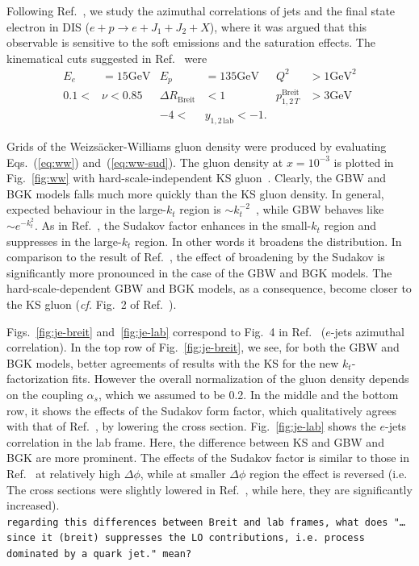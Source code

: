 \documentclass[12pt]{article}
\numberwithin{equation}{section}
\numberwithin{table}{section}
\numberwithin{figure}{section}
\newcommand{\GeV}[0]{\mathrm{GeV}}
\newcommand{\comment}[1]{\texttt{\color{red}#1}}
\begin{document}
Following Ref.~\cite{vanHameren:2021sqc}, we study the azimuthal correlations of jets and the final state electron in DIS ($e+p\rightarrow e+J_1+J_2+X$), where it was argued that this observable is sensitive to the soft emissions and the saturation effects. 
The kinematical cuts suggested in Ref.~\cite{vanHameren:2021sqc} were
\begin{align*}
	E_e&=15\GeV& E_p&=135\GeV& Q^2&>1\GeV^2\\
	0.1<&\nu<0.85&\Delta R_{\mathrm{Breit}}&<1&p^{\mathrm{Breit}}_{1,2\,T}&>3\GeV\\
	&&-4<&y_{1,2\,\mathrm{lab}}<-1.&&
\end{align*}

Grids of the Weizs\"acker-Williams gluon density were produced by evaluating Eqs.~(\ref{eq:ww}) and~(\ref{eq:ww-sud}).
The gluon density at $x=10^{-3}$ is plotted in Fig.~\ref{fig:ww} with hard-scale-independent KS gluon~\cite{vanHameren:2021sqc}. Clearly, the GBW and BGK models falls much more quickly than the KS gluon density. In general, expected behaviour in the large-$k_t$ region is $\sim k_t^{-2}$~\cite{Dominguez:2010xd,Dominguez:2011wm}, while GBW behaves like $\sim e^{-k_t^2}$.
As in Ref.~\cite{vanHameren:2021sqc}, the Sudakov factor enhances in the small-$k_t$ region and suppresses in the large-$k_t$ region. In other words it broadens the distribution. In comparison to the result of Ref.~\cite{vanHameren:2021sqc}, the effect of broadening by the Sudakov is significantly more pronounced in the case of the GBW and BGK models. The hard-scale-dependent GBW and BGK models, as a consequence, become closer to the KS gluon (\textit{cf.} Fig.~2 of Ref.~\cite{vanHameren:2021sqc}).  

Figs.~\ref{fig:je-breit} and~\ref{fig:je-lab} correspond to Fig.~4 in Ref.~\cite{vanHameren:2021sqc} ($e$-jets azimuthal correlation). 
In the top row of Fig.~\ref{fig:je-breit}, we see, for both the GBW and BGK models, better agreements of results with the KS for the new $k_t$-factorization fits. However the overall normalization of the gluon density depends on the coupling $\alpha_s$, which we assumed to be 0.2. In the middle and the bottom row, it shows the effects of the Sudakov form factor, which qualitatively agrees with that of Ref.~\cite{vanHameren:2021sqc}, by lowering the cross section.
Fig.~\ref{fig:je-lab} shows the $e$-jets correlation in the lab frame. Here, the difference between KS and GBW and BGK are more prominent. %
The effects of the Sudakov factor is similar to those in Ref.~\cite{vanHameren:2021sqc} at relatively high $\Delta \phi$, while at smaller $\Delta \phi$ region the effect is reversed (i.e. The cross sections were slightly lowered in Ref.~\cite{vanHameren:2021sqc}, while here, they are significantly increased). \\
\comment{regarding this differences between Breit and lab frames, what does "\dots since it (breit) suppresses the LO contributions, i.e. process dominated by a quark jet." mean?}
\end{document}
